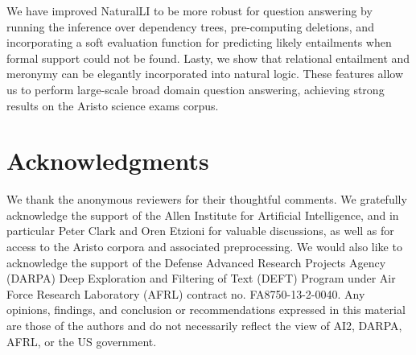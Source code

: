 We have improved NaturalLI to be more
  robust for question answering by running the inference over dependency trees,
  pre-computing deletions, and incorporating a soft evaluation function for 
  predicting likely entailments when formal support could not be found.
Lasty, we show that relational entailment and meronymy can be elegantly incorporated
  into natural logic.
These features allow us to perform large-scale broad domain question answering,
  achieving strong results on the Aristo science exams corpus.


\section*{Acknowledgments}
We thank the anonymous reviewers for their
  thoughtful comments. 
We gratefully acknowledge the support of the Allen Institute
  for Artificial Intelligence, and in particular Peter Clark and
  Oren Etzioni for
  valuable discussions, as well as for access to the Aristo corpora
  and associated preprocessing.
We would also like to acknowledge the support of the 
  Defense Advanced Research Projects Agency (DARPA) Deep Exploration
  and Filtering of Text (DEFT) Program under
  Air Force Research Laboratory (AFRL) contract
  no. FA8750-13-2-0040. 
Any opinions, findings, and conclusion or recommendations expressed
  in this material are those of the authors and
  do not necessarily reflect the view of AI2, DARPA,
  AFRL, or the US government.

